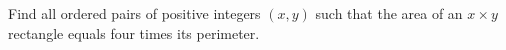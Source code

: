 Find all ordered pairs of positive integers $(x,y)$ such that the area of an $x\times y$ rectangle equals four times its perimeter.
